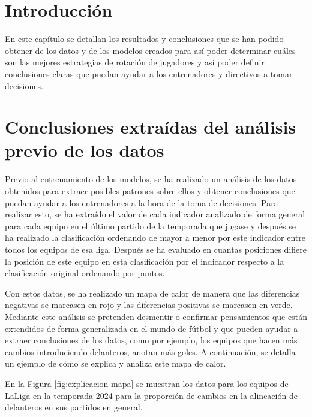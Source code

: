 
\section{Introducción}
En este capítulo se detallan los resultados y conclusiones que se han podido obtener de los datos y de los modelos creados para así poder determinar cuáles son las mejores estrategias de rotación de jugadores y así poder definir conclusiones claras que puedan ayudar a los entrenadores y directivos a tomar decisiones. 

\section{Conclusiones extraídas del análisis previo de los datos}

Previo al entrenamiento de los modelos, se ha realizado un análisis de los datos obtenidos para 
extraer posibles patrones sobre ellos y obtener conclusiones que puedan ayudar a los entrenadores a la hora de la toma de decisiones. Para realizar esto, se ha extraído el valor de cada indicador 
analizado de forma general para cada equipo en el último partido de la temporada que jugase y 
después se ha realizado la clasificación ordenando de mayor a menor por este indicador entre 
todos los equipos de esa liga. Después se ha evaluado en cuantas posiciones difiere la posición de 
este equipo en esta clasificación por el indicador respecto a la clasificación original ordenando 
por puntos. 

Con estos datos, se ha realizado un mapa de calor de manera que las diferencias negativas se 
marcasen en rojo y las diferencias positivas se marcasen en verde. Mediante este análisis se 
pretenden desmentir o confirmar pensamientos que están extendidos de forma generalizada en el 
mundo de fútbol y que pueden ayudar a extraer conclusiones de los datos, como por ejemplo, los 
equipos que hacen más cambios introduciendo delanteros, anotan más goles. A continuación, se detalla un ejemplo de cómo se explica y analiza este mapa de calor.

En la Figura \ref{fig:explicacion-mapa} se muestran los datos para los equipos de LaLiga en la temporada 2024 para 
la proporción de cambios en la alineación de delanteros en sus partidos en general.

